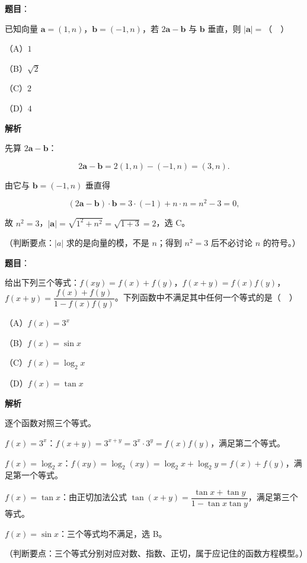 \begin{answer}

\textbf{题目}：

已知向量 $\boldsymbol a=(1,n)$，$\boldsymbol b=(-1,n)$，若 $2\boldsymbol a-\boldsymbol b$ 与 $\boldsymbol b$ 垂直，则 $|\boldsymbol a|=$（　）

（A）$1$

（B）$\sqrt2$

（C）$2$

（D）$4$

\textbf{解析}

先算 $2\boldsymbol a-\boldsymbol b$：

\nopagebreak[4]
\[2\boldsymbol a-\boldsymbol b=2(1,n)-(-1,n)=(3,n).\]

由它与 $\boldsymbol b=(-1,n)$ 垂直得

\nopagebreak[4]
\[(2\boldsymbol a-\boldsymbol b)\cdot\boldsymbol b=3\cdot(-1)+n\cdot n=n^2-3=0,\]

故 $n^2=3$，$|\boldsymbol a|=\sqrt{1^2+n^2}=\sqrt{1+3}=2$，选 C。

（判断要点：$|a|$ 求的是向量的模，不是 $n$；得到 $n^2=3$ 后不必讨论 $n$ 的符号。）


\end{answer}
\begin{answer}

\textbf{题目}：

给出下列三个等式：$f(xy)=f(x)+f(y)$，$f(x+y)=f(x)f(y)$，$f(x+y)=\dfrac{f(x)+f(y)}{1-f(x)f(y)}$。下列函数中不满足其中任何一个等式的是（　）

（A）$f(x)=3^x$

（B）$f(x)=\sin x$

（C）$f(x)=\log_2 x$

（D）$f(x)=\tan x$

\textbf{解析}

逐个函数对照三个等式。

$f(x)=3^x$：$f(x+y)=3^{x+y}=3^x\cdot3^y=f(x)f(y)$，满足第二个等式。

$f(x)=\log_2x$：$f(xy)=\log_2(xy)=\log_2x+\log_2y=f(x)+f(y)$，满足第一个等式。

$f(x)=\tan x$：由正切加法公式 $\tan(x+y)=\dfrac{\tan x+\tan y}{1-\tan x\tan y}$，满足第三个等式。

$f(x)=\sin x$：三个等式均不满足，选 B。

（判断要点：三个等式分别对应对数、指数、正切，属于应记住的函数方程模型。）


\end{answer}
